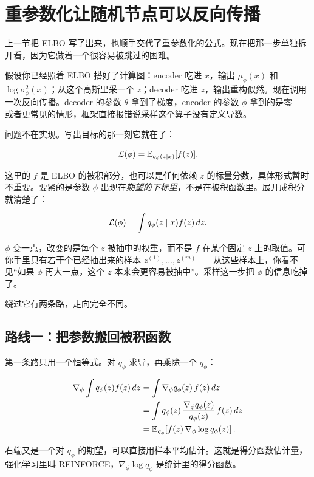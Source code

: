 \section{重参数化让随机节点可以反向传播}
\label{sec:14-Deep-Learning/06-Variational-Autoencoders/02}

上一节把 ELBO 写了出来，也顺手交代了重参数化的公式。现在把那一步单独拆开看，因为它藏着一个很容易被跳过的困难。

假设你已经照着 ELBO 搭好了计算图：encoder 吃进 \(x\)，输出 \(\mu_\phi(x)\) 和 \(\log\sigma_\phi^2(x)\)；从这个高斯里采一个 \(z\)；decoder 吃进 \(z\)，输出重构似然。现在调用一次反向传播。decoder 的参数 \(\theta\) 拿到了梯度，encoder 的参数 \(\phi\) 拿到的是零——或者更常见的情形，框架直接报错说采样这个算子没有定义导数。

问题不在实现。写出目标的那一刻它就在了：

\[
\mathcal L(\phi) = \mathbb{E}_{q_\phi(z\mid x)}[f(z)] .
\]

这里的 \(f\) 是 ELBO 的被积部分，也可以是任何依赖 \(z\) 的标量分数，具体形式暂时不重要。要紧的是参数 \(\phi\) 出现在\emph{期望的下标里}，不是在被积函数里。展开成积分就清楚了：

\[
\mathcal L(\phi) = \int q_\phi(z\mid x) f(z)\,dz.
\]

\(\phi\) 变一点，改变的是每个 \(z\) 被抽中的权重，而不是 \(f\) 在某个固定 \(z\) 上的取值。可你手里只有若干个已经抽出来的样本 \(z^{(1)},\dots,z^{(m)}\)——从这些样本上，你看不见``如果 \(\phi\) 再大一点，这个 \(z\) 本来会更容易被抽中''。采样这一步把 \(\phi\) 的信息吃掉了。

绕过它有两条路，走向完全不同。

\subsection{路线一：把参数搬回被积函数}

第一条路只用一个恒等式。对 \(q_\phi\) 求导，再乘除一个 \(q_\phi\)：

\[
\begin{aligned}
\nabla_\phi \int q_\phi(z) f(z)\,dz
&= \int \nabla_\phi q_\phi(z)\, f(z)\,dz\\
&= \int q_\phi(z)\,\frac{\nabla_\phi q_\phi(z)}{q_\phi(z)}\, f(z)\,dz\\
&= \mathbb{E}_{q_\phi}\!\left[f(z)\,\nabla_\phi \log q_\phi(z)\right].
\end{aligned}
\]

右端又是一个对 \(q_\phi\) 的期望，可以直接用样本平均估计。这就是得分函数估计量，强化学习里叫 REINFORCE，\(\nabla_\phi\log q_\phi\) 是统计里的得分函数。


